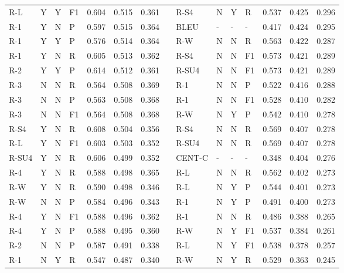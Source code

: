 \documentclass[11pt,a4paper]{article}
\begin{document}
\begin{table}[]
{\begin{tabular}{lllllllllllllll}
\textsc{R-L} & Y & Y & F1 & 0.604 & 0.515 & 0.361 &  & \textsc{R-S4} & N & Y & R & 0.537 & 0.425 & 0.296 \\
\textsc{R-1} & Y & N & P & 0.597 & 0.515 & 0.364 &  & \textsc{BLEU} & - & - & - & 0.417 & 0.424 & 0.295 \\
\textsc{R-1} & Y & Y & P & 0.576 & 0.514 & 0.364 &  & \textsc{R-W} & N & N & R & 0.563 & 0.422 & 0.287 \\
\textsc{R-1} & Y & N & R & 0.605 & 0.513 & 0.362 &  & \textsc{R-S4} & N & N & F1 & 0.573 & 0.421 & 0.289 \\
\textsc{R-2} & Y & Y & P & 0.614 & 0.512 & 0.361 &  & \textsc{R-SU4} & N & N & F1 & 0.573 & 0.421 & 0.289 \\
\textsc{R-3} & N & N & R & 0.564 & 0.508 & 0.369 &  & \textsc{R-1} & N & N & P & 0.522 & 0.416 & 0.288 \\
\textsc{R-3} & N & N & P & 0.563 & 0.508 & 0.368 &  & \textsc{R-1} & N & N & F1 & 0.528 & 0.410 & 0.282 \\
\textsc{R-3} & N & N & F1 & 0.564 & 0.508 & 0.368 &  & \textsc{R-W} & N & Y & P & 0.542 & 0.410 & 0.278 \\
\textsc{R-S4} & Y & N & R & 0.608 & 0.504 & 0.356 &  & \textsc{R-S4} & N & N & R & 0.569 & 0.407 & 0.278 \\
\textsc{R-L} & Y & N & F1 & 0.603 & 0.503 & 0.352 &  & \textsc{R-SU4} & N & N & R & 0.569 & 0.407 & 0.278 \\
\textsc{R-SU4} & Y & N & R & 0.606 & 0.499 & 0.352 &  & \textsc{CENT-C} & - & - & - & 0.348 & 0.404 & 0.276 \\
\textsc{R-4} & Y & N & R & 0.588 & 0.498 & 0.365 &  & \textsc{R-L} & N & N & R & 0.562 & 0.402 & 0.273 \\
\textsc{R-W} & Y & N & R & 0.590 & 0.498 & 0.346 &  & \textsc{R-L} & N & Y & P & 0.544 & 0.401 & 0.273 \\
\textsc{R-W} & N & N & P & 0.584 & 0.496 & 0.343 &  & \textsc{R-1} & N & Y & P & 0.491 & 0.400 & 0.273 \\
\textsc{R-4} & Y & N & F1 & 0.588 & 0.496 & 0.362 &  & \textsc{R-1} & N & N & R & 0.486 & 0.388 & 0.265 \\
\textsc{R-4} & Y & N & P & 0.588 & 0.495 & 0.360 &  & \textsc{R-W} & N & Y & F1 & 0.537 & 0.384 & 0.261 \\
\textsc{R-2} & N & N & P & 0.587 & 0.491 & 0.338 &  & \textsc{R-L} & N & Y & F1 & 0.538 & 0.378 & 0.257 \\
\textsc{R-1} & N & Y & R & 0.547 & 0.487 & 0.340 &  & \textsc{R-W} & N & Y & R & 0.529 & 0.363 & 0.245 \\

\end{tabular}}
\end{table}
\end{document}
